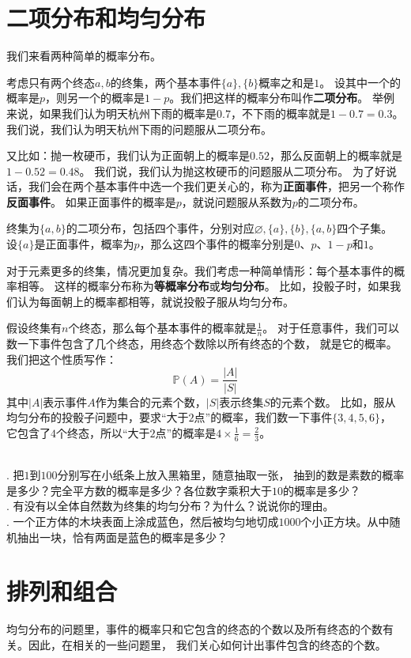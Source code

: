 \documentclass[12pt,UTF8]{ctexbook}
\begin{document}
\section{二项分布和均匀分布}

我们来看两种简单的概率分布。

考虑只有两个终态$a, b$的终集，两个基本事件$\{a\}, \{b\}$概率之和是$1$。
设其中一个的概率是$p$，则另一个的概率是$1-p$。我们把这样的概率分布叫作\textbf{二项分布}。
举例来说，如果我们认为明天杭州下雨的概率是$0.7$，不下雨的概率就是$1-0.7=0.3$。
我们说，我们认为明天杭州下雨的问题服从二项分布。

又比如：抛一枚硬币，我们认为正面朝上的概率是$0.52$，那么反面朝上的概率就是$1 - 0.52 = 0.48$。
我们说，我们认为抛这枚硬币的问题服从二项分布。
为了好说话，我们会在两个基本事件中选一个我们更关心的，称为\textbf{正面事件}，把另一个称作\textbf{反面事件}。
如果正面事件的概率是$p$，就说问题服从系数为$p$的二项分布。

终集为$\{a, b\}$的二项分布，包括四个事件，分别对应$\varnothing, \{a\}, \{b\}, \{a, b\}$四个子集。
设$\{a\}$是正面事件，概率为$p$，那么这四个事件的概率分别是$0$、$p$、$1-p$和$1$。

对于元素更多的终集，情况更加复杂。我们考虑一种简单情形：每个基本事件的概率相等。
这样的概率分布称为\textbf{等概率分布}或\textbf{均匀分布}。
比如，投骰子时，如果我们认为每面朝上的概率都相等，就说投骰子服从均匀分布。

假设终集有$n$个终态，那么每个基本事件的概率就是$\frac{1}{n}$。
对于任意事件，我们可以数一下事件包含了几个终态，用终态个数除以所有终态的个数，
就是它的概率。我们把这个性质写作：
$$ \mathbb{P}(A) = \frac{|A|}{|S|} $$
其中$|A|$表示事件$A$作为集合的元素个数，$|S|$表示终集$S$的元素个数。 
比如，服从均匀分布的投骰子问题中，要求“大于$2$点”的概率，我们数一下事件$\{3,4,5,6\}$，
它包含了$4$个终态，所以“大于$2$点”的概率是$4 \times \frac{1}{6} = \frac{2}{3}$。

\begin{xt}
    \mbox{} \\
    . 把$1$到$100$分别写在小纸条上放入黑箱里，随意抽取一张，
    抽到的数是素数的概率是多少？完全平方数的概率是多少？各位数字乘积大于$10$的概率是多少？ \\
    . 有没有以全体自然数为终集的均匀分布？为什么？说说你的理由。\\
    . 一个正方体的木块表面上涂成蓝色，然后被均匀地切成$1000$个小正方块。从中随机抽出一块，恰有两面是蓝色的概率是多少？
\end{xt}

\section{排列和组合}
均匀分布的问题里，事件的概率只和它包含的终态的个数以及所有终态的个数有关。因此，在相关的一些问题里，
我们关心如何计出事件包含的终态的个数。
\end{document}
